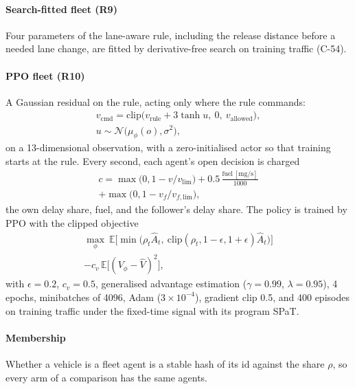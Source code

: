 \paragraph{Search-fitted fleet (R9)} Four parameters of the lane-aware rule, including the release distance before a needed lane change,
are fitted by derivative-free search on training traffic (C-54).
\paragraph{PPO fleet (R10)} A Gaussian residual on the rule, acting only where the rule commands:
\begin{gather}
v_{\mathrm{cmd}}=\mathrm{clip}\big(v_{\mathrm{rule}}+3\tanh u,\ 0,\ v_{\mathrm{allowed}}\big),\\
u\sim\mathcal N\big(\mu_\phi(o),\sigma^2\big),
\end{gather}
on a 13-dimensional observation, with a zero-initialised actor so that training starts at the rule. Every second, each agent's open
decision is charged
\begin{multline}
c=\max\big(0,1-v/v_{\mathrm{lim}}\big)+0.5\,\frac{\text{fuel}\,[\mathrm{mg/s}]}{1000}\\+\max\big(0,1-v_f/v_{f,\mathrm{lim}}\big),
\end{multline}
the own delay share, fuel, and the follower's delay share. The policy is trained by PPO with the clipped objective
\begin{multline}
\max_\phi\ \mathbb E\Big[\min\big(\rho_t\hat A_t,\ \mathrm{clip}(\rho_t,1-\epsilon,1+\epsilon)\hat A_t\big)\Big]\\-c_v\,\mathbb E\big[(V_\phi-\hat V)^2\big],
\end{multline}
with $\epsilon=0.2$, $c_v=0.5$, generalised advantage estimation ($\gamma=0.99$, $\lambda=0.95$), 4 epochs, minibatches of 4096, Adam
($3\times10^{-4}$), gradient clip 0.5, and 400 episodes on training traffic under the fixed-time signal with its program SPaT.
\paragraph{Membership} Whether a vehicle is a fleet agent is a stable hash of its id against the share $\rho$, so every arm of a
comparison has the same agents.

